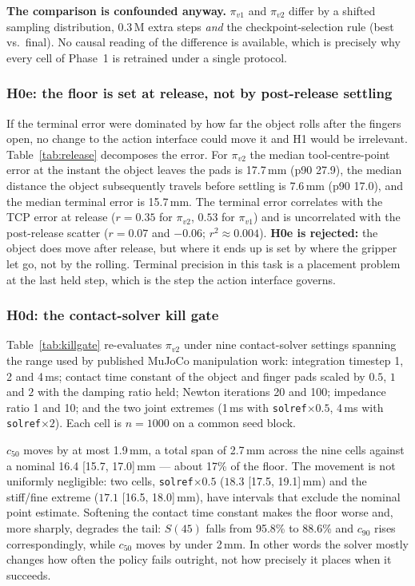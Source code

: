 \documentclass{article}
\begin{document}
\textbf{The comparison is confounded anyway.} $\pi_{v1}$ and $\pi_{v2}$ differ
by a shifted sampling distribution, 0.3\,M extra steps \emph{and} the
checkpoint-selection rule (best vs.\ final). No causal reading of the difference
is available, which is precisely why every cell of Phase~1 is retrained under a
single protocol.

\subsubsection{H0e: the floor is set at release, not by post-release settling}



If the terminal error were dominated by how far the object rolls after the
fingers open, no change to the action interface could move it and H1 would be
irrelevant. Table~\ref{tab:release} decomposes the error. For $\pi_{v2}$ the
median tool-centre-point error at the instant the object leaves the pads is
17.7\,mm (p90 27.9), the median distance the object subsequently travels before
settling is 7.6\,mm (p90 17.0), and the median terminal error is 15.7\,mm. The
terminal error correlates with the TCP error at release ($r{=}0.35$ for
$\pi_{v2}$, $0.53$ for $\pi_{v1}$) and is uncorrelated with the post-release
scatter ($r{=}0.07$ and $-0.06$; $r^2 \approx 0.004$). \textbf{H0e is rejected:}
the object does move after release, but where it ends up is set by where the
gripper let go, not by the rolling. Terminal precision in this task is a
placement problem at the last held step, which is the step the action interface
governs.

\subsubsection{H0d: the contact-solver kill gate}
\label{sec:killgate}



Table~\ref{tab:killgate} re-evaluates $\pi_{v2}$ under nine contact-solver
settings spanning the range used by published MuJoCo manipulation work:
integration timestep 1, 2 and 4\,ms; contact time constant of the object and
finger pads scaled by $0.5$, $1$ and $2$ with the damping ratio held; Newton
iterations 20 and 100; impedance ratio 1 and 10; and the two joint extremes
(1\,ms with \texttt{solref}$\times0.5$, 4\,ms with \texttt{solref}$\times2$).
Each cell is $n{=}1000$ on a common seed block.

$c_{50}$ moves by at most 1.9\,mm, a total span of 2.7\,mm across the nine
cells against a nominal 16.4 [15.7, 17.0]\,mm --- about 17\% of the floor. The
movement is not uniformly negligible: two cells, \texttt{solref}$\times0.5$
($18.3$ [17.5, 19.1]\,mm) and the stiff/fine extreme ($17.1$ [16.5, 18.0]\,mm),
have intervals that exclude the nominal point estimate. Softening the contact
time constant makes the floor worse and, more sharply, degrades the tail:
$S(45)$ falls from 95.8\% to 88.6\% and $c_{90}$ rises correspondingly, while
$c_{50}$ moves by under 2\,mm. In other words the solver mostly changes how
often the policy fails outright, not how precisely it places when it succeeds.
\end{document}
